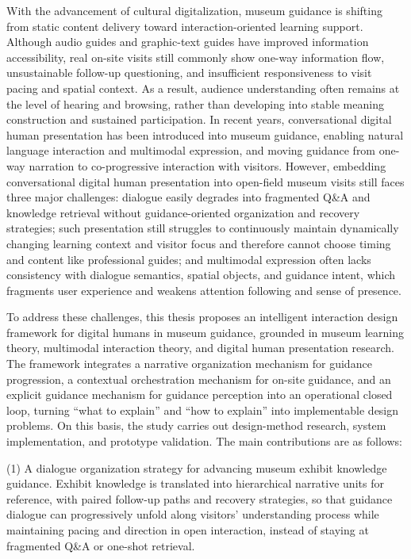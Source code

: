 \begin{eabstract}
With the advancement of cultural digitalization, museum guidance is shifting from static content delivery toward interaction-oriented learning support. Although audio guides and graphic-text guides have improved information accessibility, real on-site visits still commonly show one-way information flow, unsustainable follow-up questioning, and insufficient responsiveness to visit pacing and spatial context. As a result, audience understanding often remains at the level of hearing and browsing, rather than developing into stable meaning construction and sustained participation. In recent years, conversational digital human presentation has been introduced into museum guidance, enabling natural language interaction and multimodal expression, and moving guidance from one-way narration to co-progressive interaction with visitors. However, embedding conversational digital human presentation into open-field museum visits still faces three major challenges: dialogue easily degrades into fragmented Q\&A and knowledge retrieval without guidance-oriented organization and recovery strategies; such presentation still struggles to continuously maintain dynamically changing learning context and visitor focus and therefore cannot choose timing and content like professional guides; and multimodal expression often lacks consistency with dialogue semantics, spatial objects, and guidance intent, which fragments user experience and weakens attention following and sense of presence.

To address these challenges, this thesis proposes an intelligent interaction design framework for digital humans in museum guidance, grounded in museum learning theory, multimodal interaction theory, and digital human presentation research. The framework integrates a narrative organization mechanism for guidance progression, a contextual orchestration mechanism for on-site guidance, and an explicit guidance mechanism for guidance perception into an operational closed loop, turning “what to explain” and “how to explain” into implementable design problems. On this basis, the study carries out design-method research, system implementation, and prototype validation. The main contributions are as follows:

(1) A dialogue organization strategy for advancing museum exhibit knowledge guidance. Exhibit knowledge is translated into hierarchical narrative units for reference, with paired follow-up paths and recovery strategies, so that guidance dialogue can progressively unfold along visitors’ understanding process while maintaining pacing and direction in open interaction, instead of staying at fragmented Q\&A or one-shot retrieval.


\end{eabstract}
